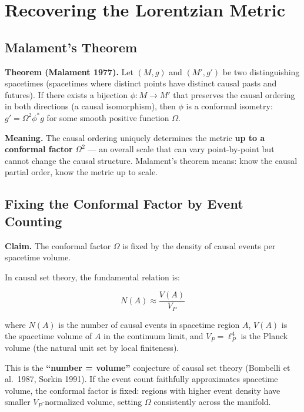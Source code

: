 \documentclass[11pt]{article}
\theoremstyle{definition}
\theoremstyle{remark}
\begin{document}
\medskip

\section{Recovering the Lorentzian
Metric}\label{recovering-the-lorentzian-metric}

\subsection{Malament's Theorem}\label{malaments-theorem}

\textbf{Theorem (Malament 1977).} Let \((M, g)\) and \((M', g')\) be two
distinguishing spacetimes (spacetimes where distinct points have
distinct causal pasts and futures). If there exists a bijection
\(\phi: M \to M'\) that preserves the causal ordering in both directions
(a causal isomorphism), then \(\phi\) is a conformal isometry:
\(g' = \Omega^2 \phi^{\ast} g\) for some smooth positive function
\(\Omega\).

\textbf{Meaning.} The causal ordering uniquely determines the metric
\textbf{up to a conformal factor} \(\Omega^2\) --- an overall scale that
can vary point-by-point but cannot change the causal structure.
Malament's theorem means: know the causal partial order, know the metric
up to scale.

\subsection{Fixing the Conformal Factor by Event
Counting}\label{fixing-the-conformal-factor-by-event-counting}

\textbf{Claim.} The conformal factor \(\Omega\) is fixed by the density
of causal events per spacetime volume.

In causal set theory, the fundamental relation is:

\[N(A) \approx \frac{V(A)}{V_P}\]

where \(N(A)\) is the number of causal events in spacetime region \(A\),
\(V(A)\) is the spacetime volume of \(A\) in the continuum limit, and
\(V_P = \ell_P^4\) is the Planck volume (the natural unit set by local
finiteness).

This is the \textbf{``number = volume''} conjecture of causal set theory
(Bombelli et al.~1987, Sorkin 1991). If the event count faithfully
approximates spacetime volume, the conformal factor is fixed: regions
with higher event density have smaller \(V_P\)-normalized volume,
setting \(\Omega\) consistently across the manifold.
\end{document}
